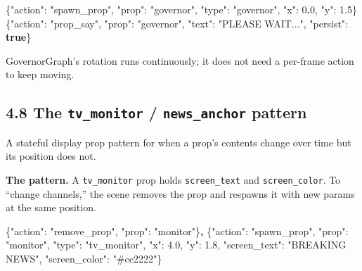 \documentclass[
  11pt,
]{book}
\newenvironment{Shaded}{}{}
\newcommand{\DataTypeTok}[1]{\textcolor[rgb]{0.56,0.13,0.00}{#1}}
\newcommand{\DecValTok}[1]{\textcolor[rgb]{0.25,0.63,0.44}{#1}}
\newcommand{\ErrorTok}[1]{\textcolor[rgb]{1.00,0.00,0.00}{\textbf{#1}}}
\newcommand{\FloatTok}[1]{\textcolor[rgb]{0.25,0.63,0.44}{#1}}
\newcommand{\FunctionTok}[1]{\textcolor[rgb]{0.02,0.16,0.49}{#1}}
\newcommand{\KeywordTok}[1]{\textcolor[rgb]{0.00,0.44,0.13}{\textbf{#1}}}
\newcommand{\StringTok}[1]{\textcolor[rgb]{0.25,0.44,0.63}{#1}}
\begin{document}
\begin{Shaded}
\begin{Highlighting}[]
\FunctionTok{\{}\DataTypeTok{"action"}\FunctionTok{:} \StringTok{"spawn\_prop"}\FunctionTok{,} \DataTypeTok{"prop"}\FunctionTok{:} \StringTok{"governor"}\FunctionTok{,}
 \DataTypeTok{"type"}\FunctionTok{:} \StringTok{"governor"}\FunctionTok{,} \DataTypeTok{"x"}\FunctionTok{:} \DecValTok{0}\ErrorTok{.}\DecValTok{0}\FunctionTok{,} \DataTypeTok{"y"}\FunctionTok{:} \FloatTok{1.5}\FunctionTok{\}}
\FunctionTok{\{}\DataTypeTok{"action"}\FunctionTok{:} \StringTok{"prop\_say"}\FunctionTok{,} \DataTypeTok{"prop"}\FunctionTok{:} \StringTok{"governor"}\FunctionTok{,}
 \DataTypeTok{"text"}\FunctionTok{:} \StringTok{"PLEASE WAIT..."}\FunctionTok{,} \DataTypeTok{"persist"}\FunctionTok{:} \KeywordTok{true}\FunctionTok{\}}
\end{Highlighting}
\end{Shaded}

GovernorGraph's rotation runs continuously; it does not need a per-frame
action to keep moving.

\subsection{\texorpdfstring{4.8 The \texttt{tv\_monitor} /
\texttt{news\_anchor}
pattern}{4.8 The tv\_monitor / news\_anchor pattern}}\label{the-tv_monitor-news_anchor-pattern}

A stateful display prop pattern for when a prop's contents change over
time but its position does not.

\textbf{The pattern.} A \texttt{tv\_monitor} prop holds
\texttt{screen\_text} and \texttt{screen\_color}. To ``change
channels,'' the scene removes the prop and respawns it with new params
at the same position.

\begin{Shaded}
\begin{Highlighting}[]
\FunctionTok{\{}\DataTypeTok{"action"}\FunctionTok{:} \StringTok{"remove\_prop"}\FunctionTok{,} \DataTypeTok{"prop"}\FunctionTok{:} \StringTok{"monitor"}\FunctionTok{\}}\ErrorTok{,}
\FunctionTok{\{}\DataTypeTok{"action"}\FunctionTok{:} \StringTok{"spawn\_prop"}\FunctionTok{,} \DataTypeTok{"prop"}\FunctionTok{:} \StringTok{"monitor"}\FunctionTok{,}
 \DataTypeTok{"type"}\FunctionTok{:} \StringTok{"tv\_monitor"}\FunctionTok{,} \DataTypeTok{"x"}\FunctionTok{:} \FloatTok{4.0}\FunctionTok{,} \DataTypeTok{"y"}\FunctionTok{:} \FloatTok{1.8}\FunctionTok{,}
 \DataTypeTok{"screen\_text"}\FunctionTok{:} \StringTok{"BREAKING NEWS"}\FunctionTok{,} \DataTypeTok{"screen\_color"}\FunctionTok{:} \StringTok{"\#cc2222"}\FunctionTok{\}}
\end{Highlighting}
\end{Shaded}
\end{document}
